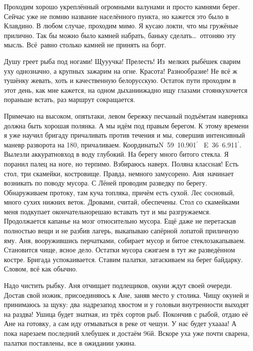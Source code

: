 Проходим хорошо укреплённый огромными валунами и просто камнями берег. Сейчас уже не помню название населённого пункта, но кажется это было в Клавдино. В любом случае, проходим мимо. Я кусаю локти, что мы гружёные прилично. Так бы можно было камней набрать, баньку сделать\ldots~отгоняю эту мысль. Всё~равно столько камней не принять на борт.

Душу греет рыба под ногами! Щу\sdash у\sdash учка! Прелесть! Из~мелких рыбёшек сварим уху однозначно, а крупных зажарим на огне. Красота! Разнообразие! Не всё ж тушёнку жевать, хоть и качественную белорусскую. Остаток пути проходим в этот день, как мне кажется, на одном дыхании\mdash жадно ищу глазами стоянку\mdash хочется пораньше встать, раз маршрут сокращается. 

Примечаю на высоком, опять\sdash таки, левом бережку песчаный подъём\mdash там наверняка должна быть хорошая полянка. А мы идём под правым берегом. К этому времени я уже научил бригаду причаливать против течения и мы, совершив интенсивный маневр разворота на 180\degree, причаливаем. Координаты\mdash N~59\degree~10.901$^\prime$~ E~36\degree~6.911$^\prime$. Вылезли аккуратно\mdash вход в воду глубокий. На берегу много битого стекла. Я поранил палец на ноге, но терпимо. Взбираюсь наверх. Поляна классная! Есть стол, три скамейки, костровище. Правда, немного замусорено. Аня~начинает возникать по поводу мусора. С Лёней проводим разведку по берегу. Обнаруживаем протоку, там куча топляка, причём есть сухой. Лес сосновый, много сухих нижних веток. Дровами, считай, обеспечены. Стол со скамейками меня подкупает окончательно\mdash решаю вставать тут и мы разгружаемся. Продолжается капанье на мозг относительно мусора. Ещё даже не перетаскав полностью вещи и не разбив лагерь, выкапываю сапёрной лопатой приличную яму. Аня, вооружившись перчатками, собирает мусор и битое стекло\mdash закапываем. Становится чище, ясное дело. Остатки мусора сжигаем в тут же разведённом костре. Бригада успокаивается. Ставим палатки, затаскиваем на берег байдарку. Словом, всё как обычно. 

Надо чистить рыбку. Аня отчищает подлещиков, окуни ждут своей очереди. Достав свой ножик, присоединяюсь к Ане, заняв место у столика. Чищу окуней и принимаюсь за щуку: два~надреза\mdash под хвостом и у головы\mdash и внутренности выходят на раз\sdash два! Ушица будет знатная, из трёх сортов рыб. Покончив с рыбой, отдаю её Ане на готовку, а сам иду отмываться в реке от чешуи. У нас будет уха\sdash а\sdash а\sdash а! А пока нарезаем последний хлебушек и достаём 96\sdash й. Вскоре уха уже почти сварена, палатки поставлены, все в ожидании ужина. 

